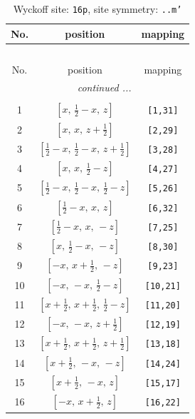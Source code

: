 \documentclass[fleqn,8pt]{jsarticle}
\begin{document}
\renewcommand{\arraystretch}{1.2}
\begin{longtable}{ccc}
\caption{Wyckoff site: {\tt 16p}, site symmetry: {\tt ..m'}}
 \\
 \hline \hline
No. & position & mapping \\ \hline \endfirsthead

\multicolumn{2}{l}{\tablename\ \thetable{}} \\
 \hline \hline
No. & position & mapping \\ \hline \endhead

 \hline \hline
\multicolumn{2}{r}{\footnotesize\it continued ...} \\ \endfoot

 \hline \hline
\multicolumn{2}{r}{} \\ \endlastfoot

1 & $\left[ x,\, \frac{1}{2} - x,\, z \right]$ & {\tt [1,31]} \\ \hline
2 & $\left[ x,\, x,\, z + \frac{1}{2} \right]$ & {\tt [2,29]} \\ \hline
3 & $\left[ \frac{1}{2} - x,\, \frac{1}{2} - x,\, z + \frac{1}{2} \right]$ & {\tt [3,28]} \\ \hline
4 & $\left[ x,\, x,\, \frac{1}{2} - z \right]$ & {\tt [4,27]} \\ \hline
5 & $\left[ \frac{1}{2} - x,\, \frac{1}{2} - x,\, \frac{1}{2} - z \right]$ & {\tt [5,26]} \\ \hline
6 & $\left[ \frac{1}{2} - x,\, x,\, z \right]$ & {\tt [6,32]} \\ \hline
7 & $\left[ \frac{1}{2} - x,\, x,\, - z \right]$ & {\tt [7,25]} \\ \hline
8 & $\left[ x,\, \frac{1}{2} - x,\, - z \right]$ & {\tt [8,30]} \\ \hline
9 & $\left[ - x,\, x + \frac{1}{2},\, - z \right]$ & {\tt [9,23]} \\ \hline
10 & $\left[ - x,\, - x,\, \frac{1}{2} - z \right]$ & {\tt [10,21]} \\ \hline
11 & $\left[ x + \frac{1}{2},\, x + \frac{1}{2},\, \frac{1}{2} - z \right]$ & {\tt [11,20]} \\ \hline
12 & $\left[ - x,\, - x,\, z + \frac{1}{2} \right]$ & {\tt [12,19]} \\ \hline
13 & $\left[ x + \frac{1}{2},\, x + \frac{1}{2},\, z + \frac{1}{2} \right]$ & {\tt [13,18]} \\ \hline
14 & $\left[ x + \frac{1}{2},\, - x,\, - z \right]$ & {\tt [14,24]} \\ \hline
15 & $\left[ x + \frac{1}{2},\, - x,\, z \right]$ & {\tt [15,17]} \\ \hline
16 & $\left[ - x,\, x + \frac{1}{2},\, z \right]$ & {\tt [16,22]} \\
\end{longtable}
\end{document}
